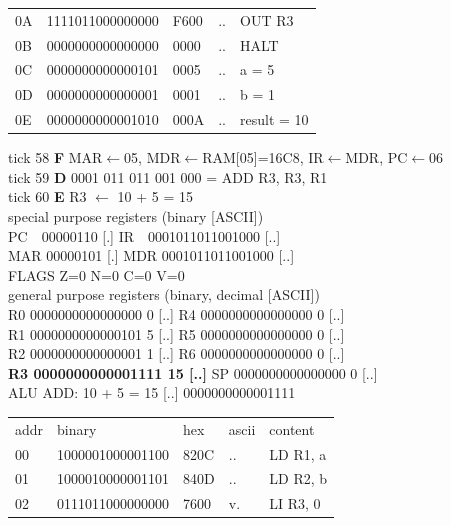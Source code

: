 \begin{tcolorbox}[stepbox, title={Instruction 19 \hfill ticks 55 to 57 \quad BLE done}]
{\begin{tabular}{@{}lllll@{}}
0A & 1111011000000000 & F600 & .. & OUT R3\\
0B & 0000000000000000 & 0000 & .. & HALT\\
\rowcolor{datac}0C & 0000000000000101 & 0005 & .. & a = 5\\
\rowcolor{datac}0D & 0000000000000001 & 0001 & .. & b = 1\\
\rowcolor{datac}0E & 0000000000001010 & 000A & .. & result = 10\\
\end{tabular}}
\end{tcolorbox}\hfill\begin{tcolorbox}[stepbox, title={Instruction 20 \hfill ticks 58 to 60 \quad ADD R3, R3, R1}]
\textcolor{dim}{tick 58} \textbf{F} MAR$\leftarrow$05, MDR$\leftarrow$RAM[05]=16C8, IR$\leftarrow$MDR, PC$\leftarrow$06\\
\textcolor{dim}{tick 59} \textbf{D} 0001 011 011 001 000 = ADD R3, R3, R1\\
\textcolor{dim}{tick 60} \textbf{E} R3 $\leftarrow$ 10 + 5 = 15\\[2pt]
\textcolor{dim}{special purpose registers (binary [ASCII])}\\
PC~~00000110 [.] \hfill IR~~0001011011001000 [..]\\
MAR 00000101 [.] \hfill MDR 0001011011001000 [..]\\
FLAGS Z=0 N=0 C=0 V=0\\[2pt]
\textcolor{dim}{general purpose registers (binary, decimal [ASCII])}\\
R0 0000000000000000 0 [..] \hfill R4 0000000000000000 0 [..]\\
R1 0000000000000101 5 [..] \hfill R5 0000000000000000 0 [..]\\
R2 0000000000000001 1 [..] \hfill R6 0000000000000000 0 [..]\\
\textcolor{wrt}{\textbf{R3 0000000000001111 15 [..]}} \hfill SP 0000000000000000 0 [..]\\
\textcolor{dim}{ALU} ADD: 10 + 5 = 15 [..] \hfill 0000000000001111\\[2pt]
{\setlength{\tabcolsep}{2pt}\begin{tabular}{@{}lllll@{}}
\textcolor{dim}{addr} & \textcolor{dim}{binary} & \textcolor{dim}{hex} & \textcolor{dim}{ascii} & \textcolor{dim}{content}\\
00 & 1000001000001100 & 820C & .. & LD R1, a\\
01 & 1000010000001101 & 840D & .. & LD R2, b\\
02 & 0111011000000000 & 7600 & v. & LI R3, 0\\

\end{tabular}}
\end{tcolorbox}
